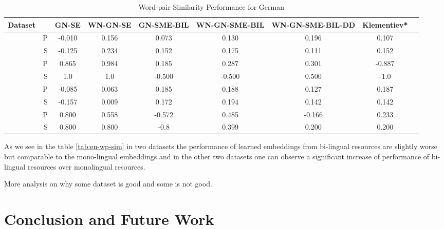 \documentclass[11pt]{article}
\begin{document}
\begin{table*}[ht]
\caption{Word-pair Similarity Performance for German } %
\label{tbl:de-wp-sim}
\centering  %
\tabcolsep=0.09cm
{\footnotesize
\begin{tabular}{cr c c c c c c c} %
\hline\hline %
 Dataset & & GN-SE  & WN-GN-SE & GN-SME-BIL &  WN-GN-SME-BIL & WN-GN-SME-BIL-DD & Klementiev*
\\ [0.5ex] 
\hline %
                                 &  P & -0.010  & 0.156 & 0.073 & 0.130&0.196 &0.107 \\[-1ex]
\raisebox{1.5ex}{wortpaare222}  &  S & -0.125 & 0.234& 0.152 & 0.175 & 0.111 &0.152 \\[1ex]

                                  &  P & 0.865 & 0.984 & 0.185 & 0.287 & 0.301 & -0.887 \\[-1ex]
\raisebox{1.5ex}{wortpaare30}    &  S & 1.0   & 1.0   & -0.500 & -0.500  & 0.500 & -1.0 \\[1ex]

                                  &  P & -0.085  & 0.063 & 0.185 & 0.188 & 0.127 &0.187 \\[-1ex]
\raisebox{1.5ex}{wortpaare350}  &  S & -0.157 & 0.009  &  0.172 & 0.194 & 0.142 &0.142 \\[1ex]

                                &  P & 0.800  & 0.558 & -0.572 & 0.485 & -0.166 & 0.233 \\[-1ex]
\raisebox{1.5ex}{wortpaare65}  &  S & 0.800 & 0.800 & -0.8 & 0.399 & 0.200 & 0.200 \\[1ex]


\hline %
     
          
 \hline %
\end{tabular}
}

\end{table*}      
          
            
As we see in the table \ref{tab:en-wp-sim} in two datasets the performance of learned embeddings from bi-lingual resources
are slightly worse but comparable to the mono-lingual embeddings and in the other two datasets one can observe a significant 
increase of performance of bi-lingual resources over monolingual resources.      


More analysis on why some dataset is good and some is not good. 
\section{Conclusion and Future Work}
\end{document}
